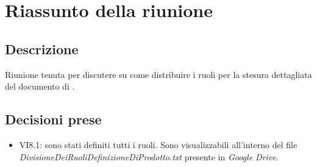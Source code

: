 \section{Riassunto della riunione}
\subsection{Descrizione}

Riunione tenuta per discutere su come distribuire i ruoli per la stesura dettagliata del documento di \DdPv.

\subsection{Decisioni prese}
\begin{itemize}
\item VI8.1: sono stati definiti tutti i ruoli. Sono visualizzabili all'interno del file \textit{DivisioneDeiRuoliDefinizioneDiProdotto.txt} presente in \textit{Google Drive}.
\end{itemize}
